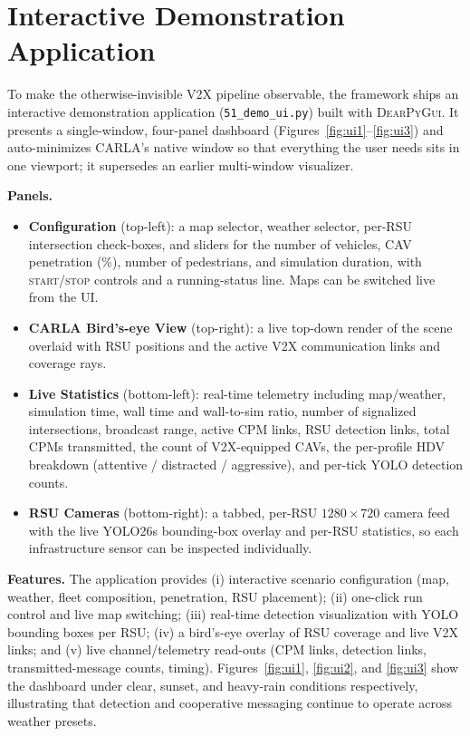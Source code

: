\documentclass[11pt]{article}
\begin{document}



\appendix
\section{Interactive Demonstration Application}
\label{app:demo}
To make the otherwise-invisible V2X pipeline observable, the framework ships an
interactive demonstration application (\texttt{51\_demo\_ui.py}) built with
\textsc{DearPyGui}. It presents a single-window, four-panel dashboard
(Figures~\ref{fig:ui1}--\ref{fig:ui3}) and auto-minimizes CARLA's native window so
that everything the user needs sits in one viewport; it supersedes an earlier
multi-window visualizer.

\noindent\textbf{Panels.}
\begin{itemize}[leftmargin=1.3em,itemsep=0.15em,topsep=0.2em]
  \item \textbf{Configuration} (top-left): a map selector, weather selector,
  per-RSU intersection check-boxes, and sliders for the number of vehicles, CAV
  penetration (\%), number of pedestrians, and simulation duration, with
  \textsc{start}/\textsc{stop} controls and a running-status line. Maps can be
  switched live from the UI.
  \item \textbf{CARLA Bird's-eye View} (top-right): a live top-down render of the
  scene overlaid with RSU positions and the active V2X communication links and
  coverage rays.
  \item \textbf{Live Statistics} (bottom-left): real-time telemetry including
  map/weather, simulation time, wall time and wall-to-sim ratio, number of
  signalized intersections, broadcast range, active CPM links, RSU detection links,
  total CPMs transmitted, the count of V2X-equipped CAVs, the per-profile HDV
  breakdown (attentive / distracted / aggressive), and per-tick YOLO detection
  counts.
  \item \textbf{RSU Cameras} (bottom-right): a tabbed, per-RSU $1280\times720$
  camera feed with the live YOLO26s bounding-box overlay and per-RSU statistics, so
  each infrastructure sensor can be inspected individually.
\end{itemize}

\noindent\textbf{Features.} The application provides (i) interactive scenario
configuration (map, weather, fleet composition, penetration, RSU placement);
(ii) one-click run control and live map switching; (iii) real-time detection
visualization with YOLO bounding boxes per RSU; (iv) a bird's-eye overlay of RSU
coverage and live V2X links; and (v) live channel/telemetry read-outs (CPM links,
detection links, transmitted-message counts, timing). Figures~\ref{fig:ui1},
\ref{fig:ui2}, and \ref{fig:ui3} show the dashboard under clear, sunset, and
heavy-rain conditions respectively, illustrating that detection and cooperative
messaging continue to operate across weather presets.
\end{document}
